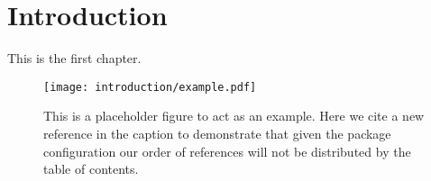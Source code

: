 \chapter{Introduction}\label{chapter:introduction}

This is the first chapter.~\cite{Aaboud:2016mmw,Bruning:782076}

\begin{figure}[htpb]
 \centering
 \texttt{[image: introduction/example.pdf]}
 \caption{This is a placeholder figure to act as an example.
  Here we cite a new reference in the caption to demonstrate that given the package configuration our order of references will not be distributed by the table of contents.~\cite{Higgs:1964ia}}\label{fig:test_figure}
\end{figure}
